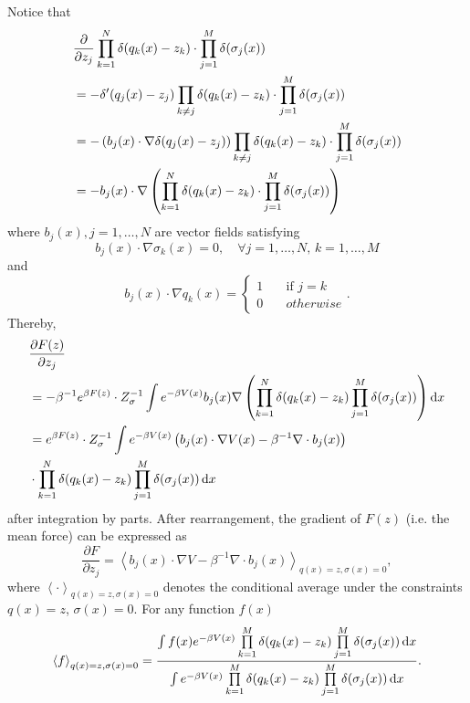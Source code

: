 Notice that
\begin{align}
    &\frac{\partial}{\partial z_j}\prod_{k=1}^{N}\delta(q_k(x)-z_k)\cdot \prod_{j=1}^M\delta(\sigma_j(x))\notag\\
    &=-\delta^{\prime}(q_j(x)-z_j)\prod_{k\neq j}\delta(q_k(x)-z_k)\cdot \prod_{j=1}^M\delta(\sigma_j(x))\notag\\
    &=-\left(b_j(x)\cdot\nabla \delta(q_j(x)-z_j)\right)\prod_{k\neq j}\delta(q_k(x)-z_k)\cdot \prod_{j=1}^M\delta(\sigma_j(x))\notag\\
    &=-b_j(x)\cdot \nabla\left(\prod_{k=1}^{N}\delta(q_k(x)-z_k)\cdot \prod_{j=1}^M\delta(\sigma_j(x))\right)
\end{align}
where $b_j(x), j=1,\dots,N$ are vector fields satisfying
\begin{equation}
	b_j(x)\cdot \nabla \sigma_k(x)=0,\quad \forall j=1,\dots,N,\, k=1,\dots,M
\end{equation}
and
\begin{equation}
	b_j(x)\cdot \nabla q_k(x)=\begin{cases}
		1\quad &\text{if } j=k\\
		0\quad &otherwise
	\end{cases}.
\end{equation}
Thereby,
\begin{align}
    &\frac{\partial F(z)}{\partial z_j}\notag\\
    &=-\beta^{-1}e^{\beta F(z)}\cdot Z_\sigma^{-1} \int e^{-\beta V(x)}b_j(x)\nabla\left(\prod_{k=1}^{N}\delta(q_k(x)-z_k)\prod_{j=1}^M\delta(\sigma_j(x))\right)\mathop{}\!\mathrm{d} x\notag\\
    &=e^{\beta F(z)}\cdot Z_\sigma^{-1} \int e^{-\beta V(x)} \left(b_j(x)\cdot \nabla V(x)-\beta^{-1}\nabla\cdot b_j(x)\right)\notag\\
    &\cdot \prod_{k=1}^{N}\delta(q_k(x)-z_k)\prod_{j=1}^M\delta(\sigma_j(x))\mathop{}\!\mathrm{d} x
\end{align}
after integration by parts. After rearrangement, the gradient of $F(z)$ (i.e. the mean force) can be expressed as
\begin{equation}
	\frac{\partial F}{\partial z_j}=\left< b_j(x)\cdot \nabla V-\beta^{-1}\nabla\cdot b_j(x)\right>_{q(x)=z,\sigma(x)=0},
	\label{eq:FEM:ABF:meanforce}
\end{equation}
where $\left<\cdot\right>_{q(x)=z,\sigma(x)=0}$ denotes the conditional average under the constraints $q(x)=z$, $\sigma(x)=0$. For any function $f(x)$
\begin{equation}
	\left<f\right>_{q(x)=z,\sigma(x)=0}=\frac{\int f(x)e^{-\beta V(x)}\prod\limits_{k=1}^{M}\delta(q_k(x)-z_k)\prod\limits_{j=1}^M\delta(\sigma_j(x))\mathop{}\!\mathrm{d} x}{\int e^{-\beta V(x)}\prod\limits_{k=1}^{M}\delta(q_k(x)-z_k)\prod\limits_{j=1}^M\delta(\sigma_j(x))\mathop{}\!\mathrm{d} x}.
	\label{eq:FEM:ABF:expectation}
\end{equation}

